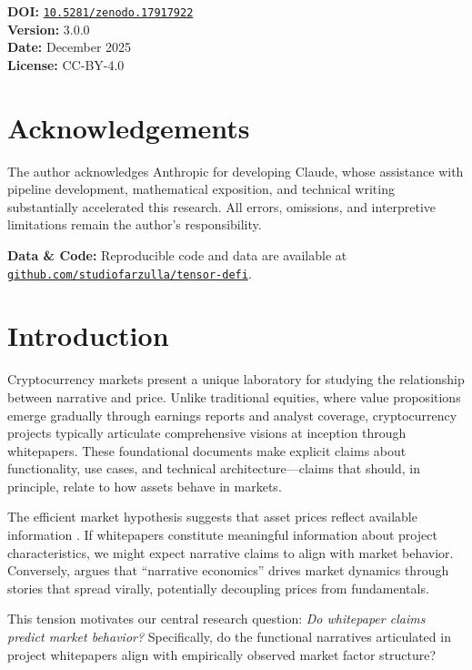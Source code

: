 \documentclass[11pt,twocolumn]{article}
\newcommand{\paperver}{3.0.0}
\newcommand{\paperdate}{December 2025}
\newcommand{\paperdoi}{10.5281/zenodo.17917922}
\newcommand{\metadatabox}[1]{%
\begin{tcolorbox}[
    colback=gray!5,
    colframe=farzullaburgundy,
    title=Publication Metadata,
    fonttitle=\bfseries,
    coltitle=white,
    colbacktitle=farzullaburgundy,
    width=\columnwidth,
    arc=2mm,
    boxrule=0.8pt
]
\small
\textbf{DOI:} \href{https://doi.org/#1}{\texttt{#1}}\\
\textbf{Version:} \paperver\\
\textbf{Date:} \paperdate\\
\textbf{License:} CC-BY-4.0
\end{tcolorbox}
}
\begin{document}
\vspace{1em}
\metadatabox{\paperdoi}

\vspace{1em}

\section*{Acknowledgements}

The author acknowledges Anthropic for developing Claude, whose assistance with pipeline development, mathematical exposition, and technical writing substantially accelerated this research. All errors, omissions, and interpretive limitations remain the author's responsibility.

\vspace{0.5em}
\noindent\textbf{Data \& Code:} Reproducible code and data are available at \href{https://github.com/studiofarzulla/tensor-defi}{\texttt{github.com/studiofarzulla/tensor-defi}}.


\clearpage
\twocolumn
{}

\section{Introduction}

Cryptocurrency markets present a unique laboratory for studying the relationship between narrative and price. Unlike traditional equities, where value propositions emerge gradually through earnings reports and analyst coverage, cryptocurrency projects typically articulate comprehensive visions at inception through whitepapers. These foundational documents make explicit claims about functionality, use cases, and technical architecture---claims that should, in principle, relate to how assets behave in markets.

The efficient market hypothesis suggests that asset prices reflect available information \citep{fama1970efficient}. If whitepapers constitute meaningful information about project characteristics, we might expect narrative claims to align with market behavior. Conversely, \citet{shiller2017narrative} argues that ``narrative economics'' drives market dynamics through stories that spread virally, potentially decoupling prices from fundamentals.

This tension motivates our central research question: \textit{Do whitepaper claims predict market behavior?} Specifically, do the functional narratives articulated in project whitepapers align with empirically observed market factor structure?
\end{document}
